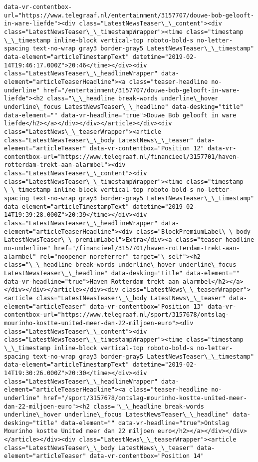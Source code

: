 \documentclass[11pt]{article}
\begin{document}
\begin{Verbatim}[commandchars=\\\{\}]
data-vr-contentbox-url="https://www.telegraaf.nl/entertainment/3157707/douwe-bob-gelooft-in-ware-liefde"><div class="LatestNewsTeaser\_\_content"><div class="LatestNewsTeaser\_\_timestampWrapper"><time class="timestamp \_\_timestamp inline-block vertical-top roboto-bold-s no-letter-spacing text-no-wrap gray3 border-gray5 LatestNewsTeaser\_\_timestamp" data-element="articleTimestampText" datetime="2019-02-14T19:46:17.000Z">20:46</time></div><div class="LatestNewsTeaser\_\_headlineWrapper" data-element="articleTeaserHeadline"><a class="teaser-headline no-underline" href="/entertainment/3157707/douwe-bob-gelooft-in-ware-liefde"><h2 class="\_\_headline break-words underline\_hover underline\_focus LatestNewsTeaser\_\_headline" data-desking="title" data-element="" data-vr-headline="true">Douwe Bob gelooft in ware liefde</h2></a></div></div></article></div><div class="LatestNews\_\_teaserWrapper"><article class="LatestNewsTeaser\_\_body LatestNews\_\_teaser" data-element="articleTeaser" data-vr-contentbox="Position 12" data-vr-contentbox-url="https://www.telegraaf.nl/financieel/3157701/haven-rotterdam-trekt-aan-alarmbel"><div class="LatestNewsTeaser\_\_content"><div class="LatestNewsTeaser\_\_timestampWrapper"><time class="timestamp \_\_timestamp inline-block vertical-top roboto-bold-s no-letter-spacing text-no-wrap gray3 border-gray5 LatestNewsTeaser\_\_timestamp" data-element="articleTimestampText" datetime="2019-02-14T19:39:28.000Z">20:39</time></div><div class="LatestNewsTeaser\_\_headlineWrapper" data-element="articleTeaserHeadline"><div class="BlockPremiumLabel\_\_body LatestNewsTeaser\_\_premiumLabel">Extra</div><a class="teaser-headline no-underline" href="/financieel/3157701/haven-rotterdam-trekt-aan-alarmbel" rel="noopener noreferrer" target="\_self"><h2 class="\_\_headline break-words underline\_hover underline\_focus LatestNewsTeaser\_\_headline" data-desking="title" data-element="" data-vr-headline="true">Haven Rotterdam trekt aan alarmbel</h2></a></div></div></article></div><div class="LatestNews\_\_teaserWrapper"><article class="LatestNewsTeaser\_\_body LatestNews\_\_teaser" data-element="articleTeaser" data-vr-contentbox="Position 13" data-vr-contentbox-url="https://www.telegraaf.nl/sport/3157678/ontslag-mourinho-kostte-united-meer-dan-22-miljoen-euro"><div class="LatestNewsTeaser\_\_content"><div class="LatestNewsTeaser\_\_timestampWrapper"><time class="timestamp \_\_timestamp inline-block vertical-top roboto-bold-s no-letter-spacing text-no-wrap gray3 border-gray5 LatestNewsTeaser\_\_timestamp" data-element="articleTimestampText" datetime="2019-02-14T19:30:26.000Z">20:30</time></div><div class="LatestNewsTeaser\_\_headlineWrapper" data-element="articleTeaserHeadline"><a class="teaser-headline no-underline" href="/sport/3157678/ontslag-mourinho-kostte-united-meer-dan-22-miljoen-euro"><h2 class="\_\_headline break-words underline\_hover underline\_focus LatestNewsTeaser\_\_headline" data-desking="title" data-element="" data-vr-headline="true">Ontslag Mourinho kostte United meer dan 22 miljoen euro</h2></a></div></div></article></div><div class="LatestNews\_\_teaserWrapper"><article class="LatestNewsTeaser\_\_body LatestNews\_\_teaser" data-element="articleTeaser" data-vr-contentbox="Position 14" 
\end{Verbatim}
\end{document}
